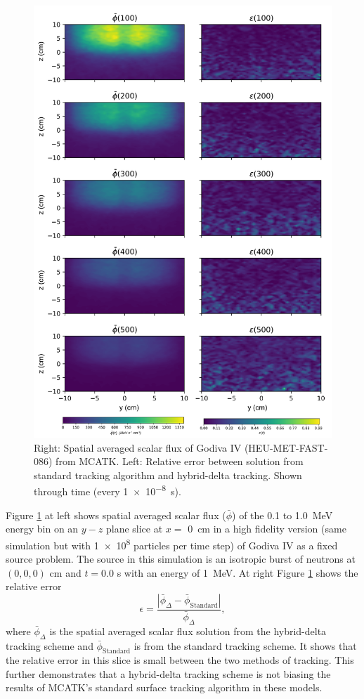 \begin{figure}[!p]
  \centering
  \includegraphics[width=.85\textwidth]{appendix/mcatk_figures/godiva_plot.png}
  \caption{Right: Spatial averaged scalar flux of Godiva IV (HEU-MET-FAST-086) from MCATK. Left: Relative error between solution from standard tracking algorithm and hybrid-delta tracking. Shown through time (every \SI{1e-8}{\s}).}
  \label{fig:godiva_results}
\end{figure}


Figure \ref{fig:godiva_results} at left shows spatial averaged scalar flux ($\bar{\phi}$) of the \num{0.1} to \SI{1.0}{\mega\electronvolt} energy bin on an $y-z$ plane slice at $x=$ \SI{0}{\centi\meter} in a high fidelity version (same simulation but with \num{1e8} particles per time step) of Godiva IV as a fixed source problem. The source in this simulation is an isotropic burst of neutrons at $(0,0,0)$ \unit{\centi\meter} and $t=0.0$ \unit{\s} with an energy of \SI{1}{\mega\electronvolt}.
At right Figure \ref{fig:godiva_results} shows the relative error
\begin{equation}
    \epsilon = \frac{\left|\bar{\phi}_{\Delta} - \bar{\phi}_{\text{Standard}}\right|}{\bar{\phi}_{\Delta}},
\end{equation}
where $\bar{\phi}_{\Delta}$ is the spatial averaged scalar flux solution from the hybrid-delta tracking scheme and $\bar{\phi}_{\text{Standard}}$ is from the standard tracking scheme.
It shows that the relative error in this slice is small between the two methods of tracking.
This further demonstrates that a hybrid-delta tracking scheme is not biasing the results of MCATK's standard surface tracking algorithm in these models. 


